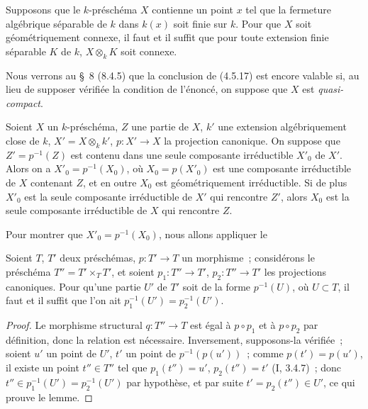 
\begin{corollary}[4.5.17]
\label{IV.2.4.5.17-fr}
Supposons que le $k$-préschéma $X$ contienne un point $x$ tel que la fermeture
algébrique séparable de $k$ dans $k(x)$ soit finie sur $k$. Pour que $X$ soit
géométriquement connexe, il faut et il suffit que pour toute extension finie
séparable $K$ de $k$, $X\otimes_k K$ soit connexe.
\end{corollary}

\begin{remark}[4.5.18]
\label{IV.2.4.5.18-fr}
Nous verrons au \S~8 (8.4.5) que la conclusion de (4.5.17) est encore valable
si, au lieu de supposer vérifiée la condition de l'énoncé, on suppose que $X$
est \emph{quasi-compact}.
\end{remark}

\begin{proposition}[4.5.19]
\label{IV.2.4.5.19-fr}
Soient $X$ un $k$-préschéma, $Z$ une partie de $X$, $k'$ une extension
algébriquement close de $k$, $X'=X\otimes_k k'$, $p:X'\to X$ la projection
canonique. On suppose que $Z'=p^{-1}(Z)$ est contenu dans une seule composante
irréductible $X'_0$ de $X'$. Alors on a $X'_0=p^{-1}(X_0)$, où
$X_0=p(X'_0)$ est une composante irréductible de $X$ contenant $Z$, et en outre
$X_0$ est géométriquement irréductible. Si de plus $X'_0$ est la seule
composante irréductible de $X'$ qui rencontre $Z'$, alors $X_0$ est la seule
composante irréductible de $X$ qui rencontre $Z$.
\end{proposition}

Pour montrer que $X'_0=p^{-1}(X_0)$, nous allons appliquer le

\begin{lemma}[4.5.19.1]
\label{IV.2.4.5.19.1-fr}
Soient $T$, $T'$ deux préschémas, $p:T'\to T$ un morphisme~; considérons le
préschéma $T''=T'\times_T T'$, et soient $p_1:T''\to T'$, $p_2:T''\to T'$ les
projections canoniques. Pour qu'une partie $U'$ de $T'$ soit de la forme
$p^{-1}(U)$, où $U\subset T$, il faut et il suffit que l'on ait
$p_1^{-1}(U')=p_2^{-1}(U')$.
\end{lemma}

\begin{proof}
Le morphisme structural $q:T''\to T$ est égal à $p\circ p_1$ et à
$p\circ p_2$ par définition, donc la relation est nécessaire. Inversement,
supposons-la vérifiée~; soient $u'$ un point de $U'$, $t'$ un point de
$p^{-1}(p(u'))$~; comme $p(t')=p(u')$, il existe un point $t''\in T''$ tel que
$p_1(t'')=u'$, $p_2(t'')=t'$ (I, 3.4.7)~; donc
$t''\in p_1^{-1}(U')=p_2^{-1}(U')$ par hypothèse, et par suite
$t'=p_2(t'')\in U'$, ce qui prouve le lemme.
\end{proof}

